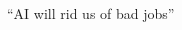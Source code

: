 \documentclass[aspectratio=43,17pt]{beamer} %
\begin{document}
\begin{frame}{``AI will rid us of bad jobs''}
\begin{columns}
\begin{column}{0.4\textwidth}
    \end{column}
    \begin{column}{0.6\textwidth}
    \end{column}
    \end{columns}
\end{frame}
\end{document}
